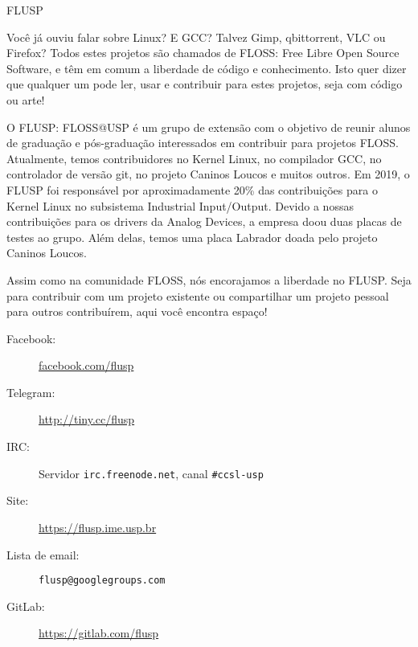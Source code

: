 \begin{subsecao}{FLUSP}


Você já ouviu falar sobre Linux? E GCC? Talvez Gimp, qbittorrent, VLC ou Firefox?
Todos estes projetos são chamados de FLOSS: Free Libre Open Source Software, e
têm em comum a liberdade de código e conhecimento. Isto quer dizer que qualquer
um pode ler, usar e contribuir para estes projetos, seja com código ou arte!

O FLUSP: FLOSS@USP é um grupo de extensão com o objetivo de reunir alunos de
graduação e pós-graduação interessados em contribuir para projetos FLOSS.
Atualmente, temos contribuidores no Kernel Linux, no compilador GCC, no controlador 
de versão git, no projeto Caninos Loucos e muitos outros. Em 2019, o FLUSP 
foi responsável por aproximadamente 20\% das contribuições para o Kernel Linux no 
subsistema Industrial Input/Output. Devido a nossas contribuições para os drivers 
da Analog Devices, a empresa doou duas placas de testes ao grupo. Além delas, temos 
uma placa Labrador doada pelo projeto Caninos Loucos.

Assim como na comunidade FLOSS, nós encorajamos a liberdade no FLUSP. Seja para
contribuir com um projeto existente ou compartilhar um projeto pessoal para
outros contribuírem, aqui você encontra espaço!

\begin{description}
  \item[Facebook:] \url{facebook.com/flusp}
  \item[Telegram:] \url{http://tiny.cc/flusp}
  \item[IRC:] Servidor \texttt{irc.freenode.net}, canal \texttt{\#ccsl-usp}
  \item[Site:] \url{https://flusp.ime.usp.br}
  \item[Lista de email:] \texttt{flusp@googlegroups.com}
  \item[GitLab:] \url{https://gitlab.com/flusp}
\end{description}

\end{subsecao}
